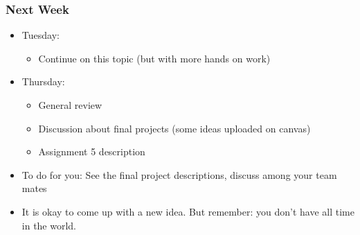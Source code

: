 \documentclass{beamer}
\begin{document}
\begin{frame}
\frametitle{Next Week}
\begin{itemize}
\item Tuesday: 
\begin{itemize}
\item Continue on this topic (but with more hands on work)
\end{itemize}
\item Thursday:
\begin{itemize}
\item General review
\item Discussion about final projects (some ideas uploaded on canvas)
\item Assignment 5 description
\end{itemize}
\item To do for you: See the final project descriptions, discuss among your team mates
\item It is okay to come up with a new idea. But remember: you don't have all time in the world. 
\end{itemize}
\end{frame}
\end{document}
